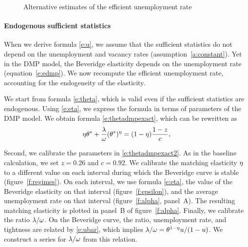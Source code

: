 \documentclass[letterpaper,12pt,leqno]{article}
\def\pdf{../../figures/xhosios_202103.pdf}
\begin{document}
\begin{figure}[t!]
\hfill
{}\vfig
{}\hfill
\caption{Alternative estimates of the efficient unemployment rate}
\label{f:robust}\end{figure}

\paragraph{Endogenous sufficient statistics} When we derive formula \eqref{e:u}, we assume that the sufficient statistics do not depend on the unemployment and vacancy rates (assumption~\ref{a:constant}). Yet in the DMP model, the Beveridge elasticity depends on the unemployment rate (equation~\eqref{e:edmp}). We now recompute the efficient unemployment rate, accounting for the endogeneity of the elasticity.

We start from formula \eqref{e:theta}, which is valid even if the sufficient statistics are endogenous. Using \eqref{e:eta}, we express the formula in terms of parameters of the DMP model.  We obtain formula \eqref{e:thetadmpexact}, which can be rewritten as
\begin{equation}
\eta\theta^* + \frac{\lambda}{\omega} (\theta^*)^{\eta} = (1-\eta) \frac{1-z}{c},
\label{e:thetadmpexact2}\end{equation}

Second, we calibrate the parameters in \eqref{e:thetadmpexact2}. As in the baseline calculation, we set $z = 0.26$ and $c = 0.92$. We calibrate the matching elasticity $\eta$ to a different value on each interval during which the Beveridge curve is stable (figure~\ref{f:regimes}). On each interval, we use formula \eqref{e:eta}, the value of the Beveridge elasticity on that interval (figure~\ref{f:epsilon}), and the average unemployment rate on that interval (figure~\ref{f:alpha}, panel~A). The resulting matching elasticity is plotted in panel~B of figure~\ref{f:alpha}. Finally, we calibrate the ratio $\lambda/\omega$. On the Beveridge curve, the ratio, unemployment rate, and tightness are related by \eqref{e:ubar}, which implies $\lambda/\omega = \theta^{1-\eta} u/(1-u)$. We construct a series for $\lambda/\omega$ from this relation.
\end{document}
